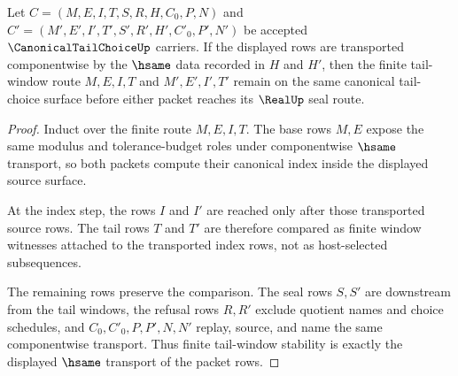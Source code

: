 \begin{theorem}
\label{thm:canonical-tail-choice-window-stability}
Let $C=(M,E,I,T,S,R,H,C_0,P,N)$ and $C'=(M',E',I',T',S',R',H',C'_0,P',N')$ be accepted $\CanonicalTailChoiceUp$ carriers. If the displayed rows are transported componentwise by the $\hsame$ data recorded in $H$ and $H'$, then the finite tail-window route $M,E,I,T$ and $M',E',I',T'$ remain on the same canonical tail-choice surface before either packet reaches its $\RealUp$ seal route.
\end{theorem}
\begin{proof}
Induct over the finite route $M,E,I,T$. The base rows $M,E$ expose the same modulus and tolerance-budget roles under componentwise $\hsame$ transport, so both packets compute their canonical index inside the displayed source surface.

At the index step, the rows $I$ and $I'$ are reached only after those transported source rows. The tail rows $T$ and $T'$ are therefore compared as finite window witnesses attached to the transported index rows, not as host-selected subsequences.

The remaining rows preserve the comparison. The seal rows $S,S'$ are downstream from the tail windows, the refusal rows $R,R'$ exclude quotient names and choice schedules, and $C_0,C'_0,P,P',N,N'$ replay, source, and name the same componentwise transport. Thus finite tail-window stability is exactly the displayed $\hsame$ transport of the packet rows.
\end{proof}

